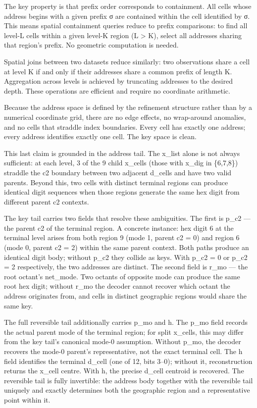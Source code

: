\documentclass[
  11pt,
  a4paper,
]{article}
\begin{document}
The key property is that prefix order corresponds to containment. All
cells whose address begins with a given prefix σ are contained within
the cell identified by σ. This means spatial containment queries reduce
to prefix comparisons: to find all level-L cells within a given level-K
region (L \textgreater{} K), select all addresses sharing that region's
prefix. No geometric computation is needed.

Spatial joins between two datasets reduce similarly: two observations
share a cell at level K if and only if their addresses share a common
prefix of length K. Aggregation across levels is achieved by truncating
addresses to the desired depth. These operations are efficient and
require no coordinate arithmetic.

Because the address space is defined by the refinement structure rather
than by a numerical coordinate grid, there are no edge effects, no
wrap-around anomalies, and no cells that straddle index boundaries.
Every cell has exactly one address; every address identifies exactly one
cell. The key space is clean.

This last claim is grounded in the address tail. The x\_list alone is
not always sufficient: at each level, 3 of the 9 child x\_cells (those
with x\_dig in \{6,7,8\}) straddle the c2 boundary between two adjacent
d\_cells and have two valid parents. Beyond this, two cells with
distinct terminal regions can produce identical digit sequences when
those regions generate the same hex digit from different parent c2
contexts.

The key tail carries two fields that resolve these ambiguities. The
first is p\_c2 --- the parent c2 of the terminal region. A concrete
instance: hex digit 6 at the terminal level arises from both region 9
(mode 1, parent c2 = 0) and region 6 (mode 0, parent c2 = 2) within the
same parent context. Both paths produce an identical digit body; without
p\_c2 they collide as keys. With p\_c2 = 0 or p\_c2 = 2 respectively,
the two addresses are distinct. The second field is r\_mo --- the root
octant's net\_mode. Two octants of opposite mode can produce the same
root hex digit; without r\_mo the decoder cannot recover which octant
the address originates from, and cells in distinct geographic regions
would share the same key.

The full reversible tail additionally carries p\_mo and h. The p\_mo
field records the actual parent mode of the terminal region; for split
x\_cells, this may differ from the key tail's canonical mode-0
assumption. Without p\_mo, the decoder recovers the mode-0 parent's
representative, not the exact terminal cell. The h field identifies the
terminal d\_cell (one of 12, bits 3--0); without it, reconstruction
returns the x\_cell centre. With h, the precise d\_cell centroid is
recovered. The reversible tail is fully invertible: the address body
together with the reversible tail uniquely and exactly determines both
the geographic region and a representative point within it.
\end{document}
